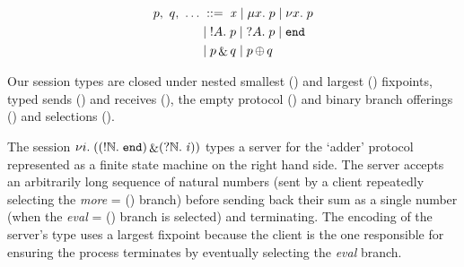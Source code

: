 \documentclass{easychair}
\begin{document}
\noindent
\begin{wrapfigure}[25]{r}{.38\textwidth}\centering%
  \vspace{-1cm}%
  \begin{align*}%
  p,~ q,~ \dots &
    \; ::= \; \recvar{x}
    \; | \; \smallest{x}{p}
    \; | \; \largest{x}{p} \\
    &
    \; | \; \send{A}{p}
    \; | \; \recv{A}{p}
    \; | \; \stopsesh{} \\
    &
    \; | \; \offer{p}{q}
    \; | \; \select{p}{q}
  \end{align*}

  \vspace{.4cm}


  \vspace{.4cm}

\end{wrapfigure}
%
Our session types are closed under
nested smallest () and largest () fixpoints,
typed sends () and receives (),
the empty protocol (\stopsesh{})
and binary branch offerings (\offer{\cdot}{\cdot}) and selections (\select{\cdot}{\cdot}).

The session
$
\nu i.\;((!\mathbb{N}.\;\mathtt{end}) \mathop{\&} (?\mathbb{N}.\;\mathit{i}))
$
types a server for the `adder' protocol represented as
a finite state machine on the right hand side.
%
The server accepts an arbitrarily long sequence of natural numbers
(sent by a client repeatedly selecting the
\emph{more} = () branch)
before sending back their sum as a single number
(when the \emph{eval} = (\send{\nat}{\stopsesh}) branch is selected)
and terminating.
%
The encoding of the server's type uses a largest fixpoint
because the client is the one responsible
for ensuring the process terminates by eventually selecting
the \emph{eval} branch.
\end{document}
